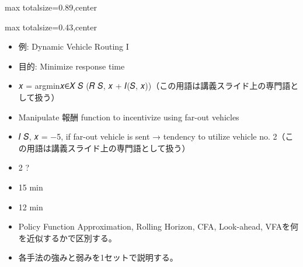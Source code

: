 \begin{minipage}[t]{0.58\textwidth}
\begin{adjustbox}{max totalsize={\textwidth}{0.89\textheight},center}
\begin{minipage}{\textwidth}
\end{minipage}
\end{adjustbox}
\end{minipage}


\clearpage
{}
\begin{minipage}[t]{0.405\textwidth}
\begin{adjustbox}{max totalsize={\textwidth}{0.43\textheight},center}
\begin{minipage}{\textwidth}\scriptsize
{}\begin{itemize}
\item 例: Dynamic Vehicle Routing I
\item 目的: Minimize response time
\item 𝑥 = argmin𝑥∈𝑋 𝑆 (𝑅 𝑆, 𝑥 + 𝐼(𝑆, 𝑥))（この用語は講義スライド上の専門語として扱う）
\item Manipulate 報酬 function to incentivize using far-out vehicles
\item 𝐼 𝑆, 𝑥 = −5, if far-out vehicle is sent → tendency to utilize vehicle no. 2（この用語は講義スライド上の専門語として扱う）
\item 2 ?
\item 15 min
\item 12 min
\end{itemize}\begin{itemize}
\item Policy Function Approximation, Rolling Horizon, CFA, Look-ahead, VFAを何を近似するかで区別する。
\item 各手法の強みと弱みを1セットで説明する。
\end{itemize}
\end{minipage}
\end{adjustbox}
\end{minipage}\hfill

